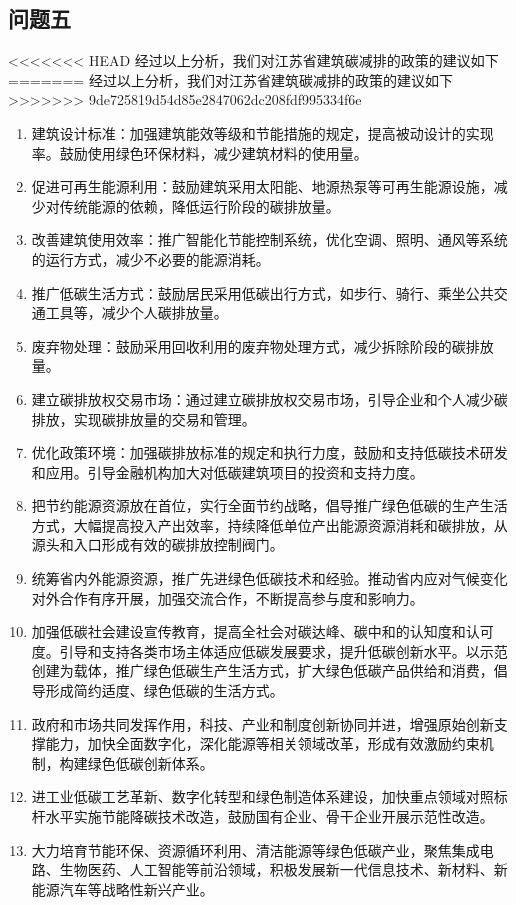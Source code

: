 \documentclass[a4paper, 12pt]{article}
\numberwithin{equation}{section}
\begin{document}
        \subsection{问题五}
<<<<<<< HEAD
        经过以上分析，我们对江苏省建筑碳减排的政策的建议如下
=======
            经过以上分析，我们对江苏省建筑碳减排的政策的建议如下
>>>>>>> 9de725819d54d85e2847062dc208fdf995334f6e
            \begin{enumerate}
                \item 建筑设计标准：加强建筑能效等级和节能措施的规定，提高被动设计的实现率。鼓励使用绿色环保材料，减少建筑材料的使用量。
                \item 促进可再生能源利用：鼓励建筑采用太阳能、地源热泵等可再生能源设施，减少对传统能源的依赖，降低运行阶段的碳排放量。
                \item 改善建筑使用效率：推广智能化节能控制系统，优化空调、照明、通风等系统的运行方式，减少不必要的能源消耗。
                \item 推广低碳生活方式：鼓励居民采用低碳出行方式，如步行、骑行、乘坐公共交通工具等，减少个人碳排放量。
                \item 废弃物处理：鼓励采用回收利用的废弃物处理方式，减少拆除阶段的碳排放量。
                \item 建立碳排放权交易市场：通过建立碳排放权交易市场，引导企业和个人减少碳排放，实现碳排放量的交易和管理。
                \item 优化政策环境：加强碳排放标准的规定和执行力度，鼓励和支持低碳技术研发和应用。引导金融机构加大对低碳建筑项目的投资和支持力度。
                \item 把节约能源资源放在首位，实行全面节约战略，倡导推广绿色低碳的生产生活方式，大幅提高投入产出效率，持续降低单位产出能源资源消耗和碳排放，从源头和入口形成有效的碳排放控制阀门。
                \item 统筹省内外能源资源，推广先进绿色低碳技术和经验。推动省内应对气候变化对外合作有序开展，加强交流合作，不断提高参与度和影响力。
                \item 加强低碳社会建设宣传教育，提高全社会对碳达峰、碳中和的认知度和认可度。引导和支持各类市场主体适应低碳发展要求，提升低碳创新水平。以示范创建为载体，推广绿色低碳生产生活方式，扩大绿色低碳产品供给和消费，倡导形成简约适度、绿色低碳的生活方式。
                \item 政府和市场共同发挥作用，科技、产业和制度创新协同并进，增强原始创新支撑能力，加快全面数字化，深化能源等相关领域改革，形成有效激励约束机制，构建绿色低碳创新体系。
                \item 进工业低碳工艺革新、数字化转型和绿色制造体系建设，加快重点领域对照标杆水平实施节能降碳技术改造，鼓励国有企业、骨干企业开展示范性改造。
                \item 大力培育节能环保、资源循环利用、清洁能源等绿色低碳产业，聚焦集成电路、生物医药、人工智能等前沿领域，积极发展新一代信息技术、新材料、新能源汽车等战略性新兴产业。
            \end{enumerate}
\end{document}
